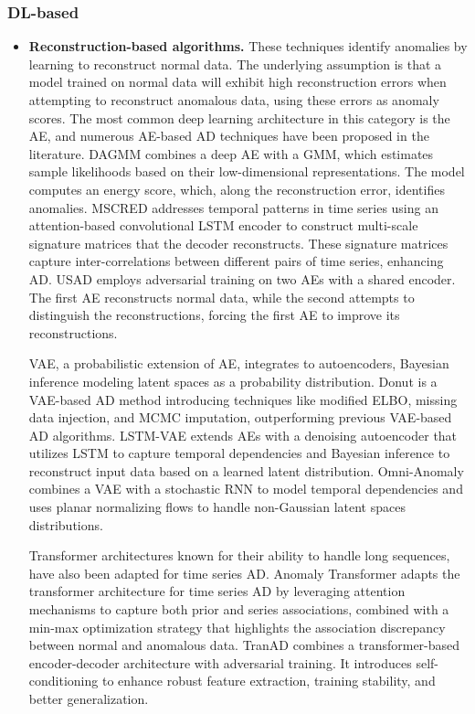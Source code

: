 \subsubsection{DL-based}
\begin{itemize}
    \item \textbf{Reconstruction-based algorithms.} These techniques identify anomalies by learning to reconstruct normal data. The underlying assumption is that a model trained on normal data will exhibit high reconstruction errors when attempting to reconstruct anomalous data, using these errors as anomaly scores.  The most common deep learning architecture in this category is the \ac{AE}, and numerous AE-based AD techniques have been proposed in the literature.
    \ac{DAGMM} \cite{zong2018deep} combines a deep AE with a \ac{GMM}, which estimates sample likelihoods based on their low-dimensional representations. The model computes an energy score, which, along the reconstruction error, identifies anomalies.
    \ac{MSCRED} \cite{zhang2019deep} addresses temporal patterns in time series using an attention-based convolutional LSTM encoder to construct multi-scale signature matrices that the decoder reconstructs. These signature matrices capture inter-correlations between different pairs of time series, enhancing AD.
    \ac{USAD} \cite{audibert2020usad} employs adversarial training on two AEs with a shared encoder. The first AE reconstructs normal data, while the second attempts to distinguish the reconstructions, forcing the first AE to improve its reconstructions.

    \ac{VAE}, a probabilistic extension of AE, integrates to autoencoders, Bayesian inference modeling latent spaces as a probability distribution.
    Donut \cite{xu2018unsupervised} is a \ac{VAE}-based AD method introducing techniques like modified \ac{ELBO}, missing data injection, and \ac{MCMC} imputation, outperforming previous VAE-based AD algorithms.
    LSTM-VAE \cite{park2018multimodal} extends AEs with a denoising autoencoder that utilizes LSTM to capture temporal dependencies and Bayesian inference to reconstruct input data based on a learned latent distribution.
    Omni-Anomaly \cite{su2019robust} combines a VAE with a stochastic RNN to model temporal dependencies and uses planar normalizing flows to handle non-Gaussian latent spaces distributions.

    Transformer architectures known for their ability to handle long sequences, have also been adapted for time series AD. 
    Anomaly Transformer \cite{xu2022anomaly} adapts the transformer architecture for time series AD by leveraging attention mechanisms to capture both prior and series associations, combined with a min-max optimization strategy that highlights the association discrepancy between normal and anomalous data.
    TranAD \cite{tuli2022tranad} combines a transformer-based encoder-decoder architecture with adversarial training. It introduces self-conditioning to enhance robust feature extraction, training stability, and better generalization.


\end{itemize}
